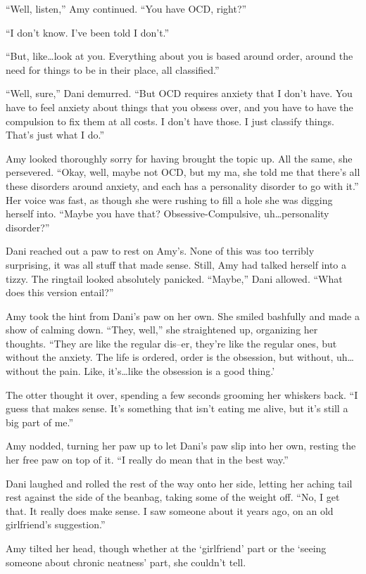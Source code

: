 ``Well, listen,'' Amy continued. ``You have OCD, right?''

``I don't know. I've been told I don't.''

``But, like\ldots{}look at you. Everything about you is based around order, around the need for things to be in their place, all classified.''

``Well, sure,'' Dani demurred. ``But OCD requires anxiety that I don't have. You have to feel anxiety about things that you obsess over, and you have to have the compulsion to fix them at all costs. I don't have those. I just classify things. That's just what I do.''

Amy looked thoroughly sorry for having brought the topic up. All the same, she persevered. ``Okay, well, maybe not OCD, but my ma, she told me that there's all these disorders around anxiety, and each has a personality disorder to go with it.'' Her voice was fast, as though she were rushing to fill a hole she was digging herself into. ``Maybe you have that? Obsessive-Compulsive, uh\ldots{}personality disorder?''

Dani reached out a paw to rest on Amy's. None of this was too terribly surprising, it was all stuff that made sense. Still, Amy had talked herself into a tizzy. The ringtail looked absolutely panicked. ``Maybe,'' Dani allowed. ``What does this version entail?''

Amy took the hint from Dani's paw on her own. She smiled bashfully and made a show of calming down. ``They, well,'' she straightened up, organizing her thoughts. ``They are like the regular dis--er, they're like the regular ones, but without the anxiety. The life is ordered, order is the obsession, but without, uh\ldots{}without the pain. Like, it's\ldots{}like the obsession is a good thing.'

The otter thought it over, spending a few seconds grooming her whiskers back. ``I guess that makes sense. It's something that isn't eating me alive, but it's still a big part of me.''

Amy nodded, turning her paw up to let Dani's paw slip into her own, resting the her free paw on top of it. ``I really do mean that in the best way.''

Dani laughed and rolled the rest of the way onto her side, letting her aching tail rest against the side of the beanbag, taking some of the weight off. ``No, I get that. It really does make sense. I saw someone about it years ago, on an old girlfriend's suggestion.''

Amy tilted her head, though whether at the `girlfriend' part or the `seeing someone about chronic neatness' part, she couldn't tell.

